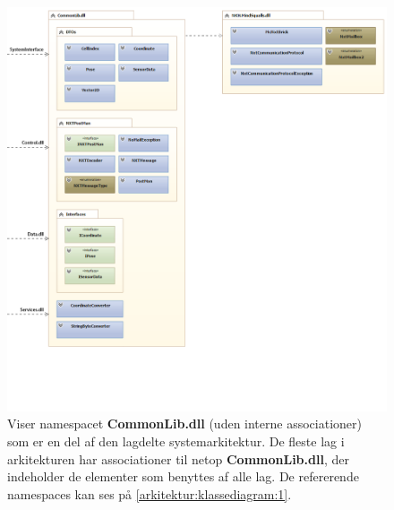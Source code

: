 \begin{figure}
\centering
\includegraphics[width=1\textwidth]{./graphics/systemarkitektur_2}
\caption{Viser namespacet \textbf{CommonLib.dll} (uden interne associationer) som er en del af den lagdelte systemarkitektur. De fleste lag i arkitekturen har associationer til netop \textbf{CommonLib.dll}, der indeholder de elementer som benyttes af alle lag. De refererende namespaces kan ses på \cref{arkitektur:klassediagram:1}.}
\label{arkitektur:klassediagram:2}
\end{figure}
